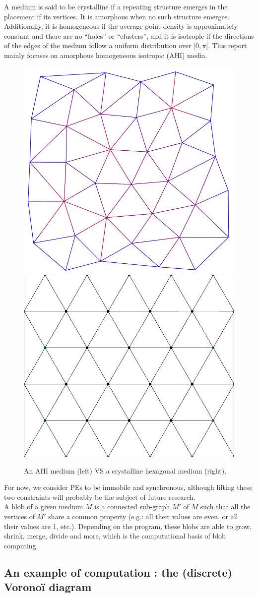 \documentclass{article}
\begin{document}
A medium is said to be crystalline if a repeating structure emerges in the placement if its vertices. It is amorphous when no such structure emerges. Additionally, it is homogeneous if the average point density is approximately constant and there are no
“holes” or “clusters”, and it is isotropic if the directions of the edges of the medium follow a uniform distribution over $[0, \pi[$. This report mainly focuses on amorphous homogeneous isotropic (AHI) media.

\begin{figure}[H]
	\centering\includegraphics[width=0.4\linewidth]{assets/amorphous_medium.png}
	\hspace{0.1\linewidth}
	\centering\includegraphics[width=0.4\linewidth]{assets/hexagonal_medium.png}
	\caption{An AHI medium (left) VS a crystalline hexagonal medium (right).}
	\label{fig:amorphous_vs_crystaline}
\end{figure}

For now, we consider PEs to be immobile and synchronous, although lifting these two constraints will probably be the subject of future research.\\

A blob of a given medium $M$ is a connected sub-graph $M'$ of $M$ such that all the vertices of $M'$ share a common property (e.g.: all their values are even, or all their values are 1, etc.). Depending on the program, these blobs are able to grow, shrink, merge, divide and more, which is the computational basis of blob computing.

\subsection{An example of computation : the (discrete) Voronoï diagram}
\end{document}

